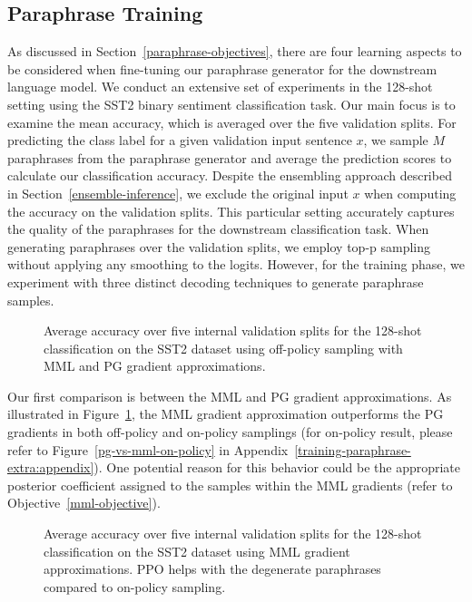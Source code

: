 \documentclass[11pt]{article}
\begin{document}
\subsection{Paraphrase Training}
As discussed in Section~\ref{paraphrase-objectives}, there are four learning aspects to be considered when fine-tuning our paraphrase generator for the downstream language model. We conduct an extensive set of experiments in the 128-shot setting using the SST2 binary sentiment classification task. Our main focus is to examine the mean accuracy, which is averaged over the five validation splits. For predicting the class label for a given validation input sentence $x$, we sample $M$ paraphrases from the paraphrase generator and average the prediction scores to calculate our classification accuracy. Despite the ensembling approach described in Section~\ref{ensemble-inference}, we exclude the original input $x$ when computing the accuracy on the validation splits. This particular setting accurately captures the quality of the paraphrases for the downstream classification task. When generating paraphrases over the validation splits, we employ top-p sampling without applying any smoothing to the logits. However, for the training phase, we experiment with three distinct decoding techniques to generate paraphrase samples.

\begin{figure}[h]

\begin{center}

\end{center}
\caption{Average accuracy over five internal validation splits for the 128-shot classification on the SST2 dataset using off-policy sampling with MML and PG gradient approximations.}
\label{pg-vs-mml-off-policy}
\end{figure}

Our first comparison is between the MML and PG gradient approximations. As illustrated in Figure~\ref{pg-vs-mml-off-policy}, the MML gradient approximation outperforms the PG gradients in both off-policy and on-policy samplings (for on-policy result, please refer to Figure~\ref{pg-vs-mml-on-policy} in Appendix~\ref{training-paraphrase-extra:appendix}). One potential reason for this behavior could be the appropriate posterior coefficient assigned to the samples within the MML gradients (refer to Objective~\ref{mml-objective}).

\begin{figure}[h]
\begin{center}

\end{center}
\caption{Average accuracy over five internal validation splits for the 128-shot classification on the SST2 dataset using MML gradient approximations. PPO helps with the degenerate paraphrases compared to on-policy sampling.}
\label{mml-vs-ppo}
\end{figure}
\end{document}
